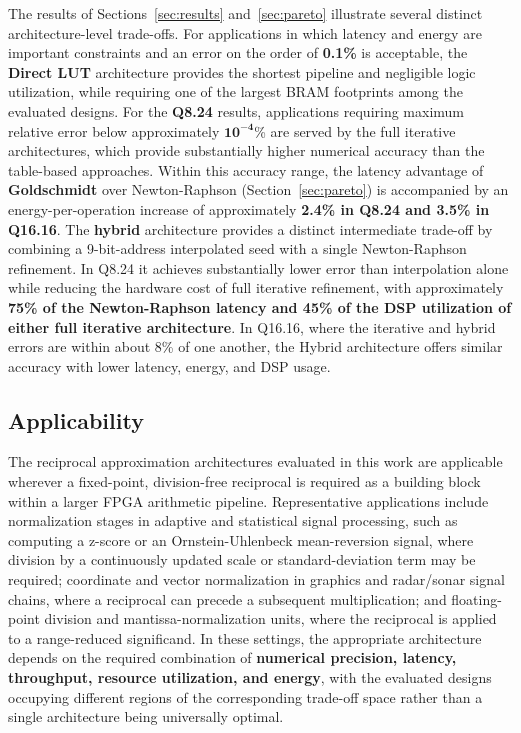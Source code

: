 \documentclass[manuscript,screen,review]{acmart}
\begin{document}
The results of Sections~\ref{sec:results} and~\ref{sec:pareto} illustrate several distinct architecture-level trade-offs. For applications in which latency and energy are important constraints and an error on the order of \textbf{0.1\%} is acceptable, the \textbf{Direct LUT} architecture provides the shortest pipeline and negligible logic utilization, while requiring one of the largest BRAM footprints among the evaluated designs. For the \textbf{Q8.24} results, applications requiring maximum relative error below approximately $\mathbf{10^{-4}}$\% are served by the full iterative architectures, which provide substantially higher numerical accuracy than the table-based approaches. Within this accuracy range, the latency advantage of \textbf{Goldschmidt} over Newton-Raphson (Section~\ref{sec:pareto}) is accompanied by an energy-per-operation increase of approximately \textbf{2.4\% in Q8.24 and 3.5\% in Q16.16}. The \textbf{hybrid} architecture provides a distinct intermediate trade-off by combining a 9-bit-address interpolated seed with a single Newton-Raphson refinement. In Q8.24 it achieves substantially lower error than interpolation alone while reducing the hardware cost of full iterative refinement, with approximately \textbf{75\% of the Newton-Raphson latency and 45\% of the DSP utilization of either full iterative architecture}. In Q16.16, where the iterative and hybrid errors are within about 8\% of one another, the Hybrid architecture offers similar accuracy with lower latency, energy, and DSP usage.

\subsection{Applicability}

The reciprocal approximation architectures evaluated in this work are applicable wherever a fixed-point, division-free reciprocal is required as a building block within a larger FPGA arithmetic pipeline. Representative applications include normalization stages in adaptive and statistical signal processing, such as computing a z-score or an Ornstein-Uhlenbeck mean-reversion signal, where division by a continuously updated scale or standard-deviation term may be required; coordinate and vector normalization in graphics and radar/sonar signal chains, where a reciprocal can precede a subsequent multiplication; and floating-point division and mantissa-normalization units, where the reciprocal is applied to a range-reduced significand. In these settings, the appropriate architecture depends on the required combination of \textbf{numerical precision, latency, throughput, resource utilization, and energy}, with the evaluated designs occupying different regions of the corresponding trade-off space rather than a single architecture being universally optimal.
\end{document}
